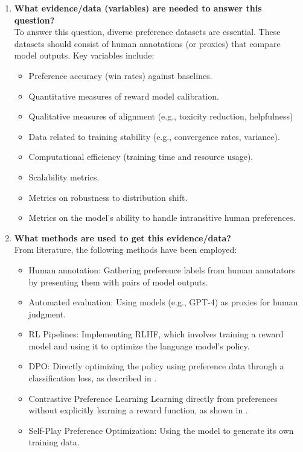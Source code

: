\documentclass[a4paper,oneside,10pt,ngerman,english]{scrartcl}
\begin{document}
\begin{enumerate}
    \item \textbf{What evidence/data (variables) are needed to answer this question?} \\
    To answer this question, diverse preference datasets are essential. These datasets should consist of human annotations (or proxies) that compare model outputs. Key variables include:
    \begin{itemize}
        \item Preference accuracy (win rates) against baselines.
        \item Quantitative measures of reward model calibration.
        \item Qualitative measures of alignment (e.g., toxicity reduction, helpfulness)
        \item Data related to training stability (e.g., convergence rates, variance).
        \item Computational efficiency (training time and resource usage).
        \item Scalability metrics.
        \item Metrics on robustness to distribution shift. 
        \item Metrics on the model's ability to handle intransitive human preferences. 
    \end{itemize}

    \item \textbf{What methods are used to get this evidence/data?} \\
    From literature, the following methods have been employed: 
    \begin{itemize}
        \item Human annotation: Gathering preference labels from human annotators by presenting them with pairs of model outputs. 
        \item Automated evaluation: Using models (e.g., GPT-4) as proxies for human judgment. 
        \item RL Pipelines: Implementing RLHF, which involves training a reward model and using it to optimize the language model's policy.
        \item  DPO: Directly optimizing the policy using preference data through a classification loss, as described in \cite{bib:Rafailov2023}.
        \item Contrastive Preference Learning Learning directly from preferences without explicitly learning a reward function, as shown in \cite{bib:Zhao2023}.
        \item Self-Play Preference Optimization: Using the model to generate its own training data.
    \end{itemize}


\end{enumerate}
\end{document}
